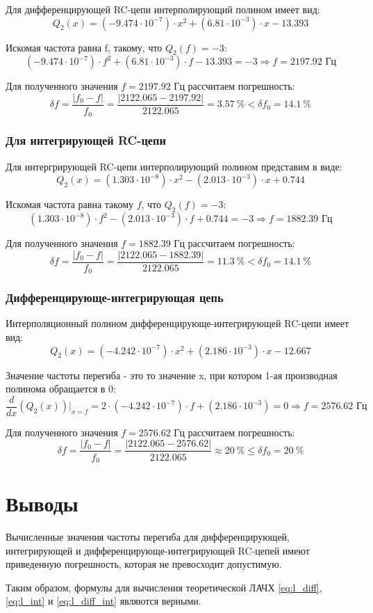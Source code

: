Для дифференцирующей RC-цепи интерполирующий полином имеет вид:
\[
Q_2(x) = (-9.474 \cdot 10^{-7}) \cdot x^2 + (6.81 \cdot 10^{-3}) \cdot x - 13.393
\]

Искомая частота равна f, такому, что $Q_2(f) = -3$:
\[
(-9.474 \cdot 10^{-7}) \cdot f^2 + (6.81 \cdot 10^{-3}) \cdot f -13.393 = -3 \Rightarrow f = 2197.92 \text{ Гц}
\]

Для полученного значения $f = 2197.92$ Гц рассчитаем погрешность:
\[
\delta f = \frac{|f_0 - f|}{f_0} = \frac{|2122.065 - 2197.92|}{2122.065} = 3.57~\% < \delta f_0 = 14.1~\%
\]

\subsubsection{Для интегрирующей RC-цепи}

Для интергрирующей RC-цепи интерполирующий полином представим в виде:
\[
Q_2(x) = (1.303 \cdot 10^{-8}) \cdot x^2 - (2.013 \cdot 10^{-3}) \cdot x + 0.744
\]

Искомая частота равна такому $f$, что $Q_2(f) = -3$:
\[
(1.303 \cdot 10^{-8}) \cdot f^2 - (2.013 \cdot 10^{-3}) \cdot f + 0.744 = -3 \Rightarrow f = 1882.39 \text{ Гц}
\]

Для полученного значения $f = 1882.39$ Гц рассчитаем погрешность:
\[
\delta f = \frac{|f_0 - f|}{f_0} = \frac{|2122.065 - 1882.39|}{2122.065} = 11.3~\% < \delta f_0 = 14.1~\%
\]

\subsubsection{Дифференцирующе-интегрирующая цепь}

Интерполяционный полином дифференцирующе-интегрирующей RC-цепи имеет вид:\\
\[
Q_2(x) = (-4.242 \cdot 10^{-7}) \cdot x^2 + (2.186 \cdot 10^{-3}) \cdot x - 12.667
\]

Значение частоты перегиба - это то значение x, при котором 1-ая производная полинома обращается в 0:
\[
\frac{d}{dx} (Q_2(x))\Big|_{x=f} = 2 \cdot (-4.242 \cdot 10^{-7}) \cdot f + (2.186 \cdot 10^{-3}) = 0 \Rightarrow f = 2576.62 \text{ Гц}
\]

Для полученного значения $f = 2576.62$ Гц рассчитаем погрешность:
\[
\delta f = \frac{|f_0 - f|}{f_0} = \frac{|2122.065 - 2576.62|}{2122.065} \approx 20~\% \leq \delta f_0 = 20~\%
\]
  
\section{Выводы}

Вычисленные значения частоты перегиба для дифференцирующей, интегрирующей и дифференцирующе-интегрирующей RC-цепей имеют приведенную погрешность, которая не превосходит допустимую. 

Таким образом, формулы для вычисления теоретической ЛАЧХ \ref{eq:l_diff}, \ref{eq:l_int} и \ref{eq:l_diff_int} являются верными.


